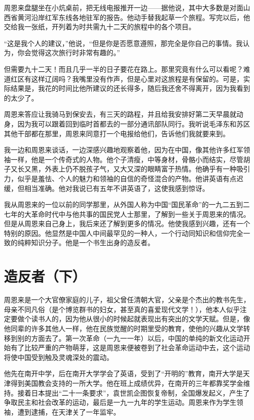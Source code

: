 \documentclass[10pt]{book}
\begin{document}
周恩来盘腿坐在小炕桌前，把无线电报推开一边——据他说，其中大多数是对面山西省黄河沿岸红军东线各地驻军的报告。他动手替我起草一个旅程。写完以后，他交给我一张纸，开列着为时共需九十二天的旅程中的各个项目。

“这是我个人的建议，”他说，“但是你是否愿意遵照，那完全是你自己的事情。我认为，你会觉得这次旅行时非常有趣的。”

但需要九十二天！而且几乎一半的日子要花在路上。那里究竟有什么可以看呢？难道红区有这样辽阔吗？我嘴里没有作声，但是心里对这旅程是有保留的。可是，实际结果是，我花的时间比他所建议的还长得多，随后我还舍不得离开，因为我看到的太少了。

周恩来答应让我骑马到保安去，有三天的路程，并且给我安排好第二天早晨就动身，因为我可以跟着回到临时首都去的一部分通讯部队同行。我听说毛泽东和苏区其他干部都在那里，周恩来同意打一个电报给他们，告诉他们我就要来到。

我一边和周恩来谈话，一边深感兴趣地观察着他，因为在中国，像其他许多红军领袖一样，他是一个传奇式的人物。他个子清瘦，中等身材，骨骼小而结实，尽管胡子又长又黑，外表上仍不脱孩子气，又大又深的眼睛富于热情。他确乎有一种吸引力，似乎是羞怯、个人的魅力和领袖的自信的奇怪混合的产物。他讲英语有点迟缓，但相当准确。他对我说已有五年不讲英语了，这使我感到惊讶。

我从周恩来的一位以前的同学那里，从外国人称为中国“国民革命”的一九二五到二七年的大革命时代中与他共事的国民党人士那里，了解到一些关于周恩来的情况。但是从周恩来自己身上，我后来还了解到更多的情况。他使我感到兴趣，还有一个特别的原因。他显然是中国人中间最罕见的一种人，一个行动同知识和信仰完全一致的纯粹知识分子。他是一个书生出身的造反者。

\section{造反者（下）}

周恩来是一个大官僚家庭的儿子，祖父曾任清朝大官，父亲是个杰出的教书先生，母亲不同凡俗（是个博览群书的妇女，甚至真的喜爱现代文学！），他本人似乎注定要做个读书人的，因为他从很小的时候起就表现出有突出的文学天赋。但是，像他同辈的许多其他人一样，他在民族觉醒的时期里受的教育，使他的兴趣从文学转移到别的方面去了。第一次革命（一九一一年）以后，中国的单纯的新文化运动开始有了比较严重的产物萌芽，这是周恩来便被卷到了社会革命运动中去，这个运动将使中国受到触及灵魂深处的震动。

他先在南开中学，后在南开大学学会了英语，受到了“开明的”教育，南开大学是天津得到美国教会支持的一所大学。他在班上成绩优异，在南开的三年都靠奖学金维持。接着日本提出“二十一条要求”，袁世凯企图恢复帝制，全国爆发起义，产生了争取民主和社会改革的运动，最后是一九一九年的学生运动。周恩来作为学生领袖，遭到逮捕，在天津关了一年监牢。
\end{document}
